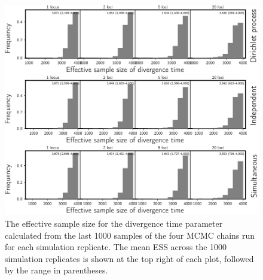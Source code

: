 \begin{figure}[htbp]
    \begin{center}
        \includegraphics[width=\textwidth,height=0.9\textheight,keepaspectratio]{../images/from-project-repo/plots/tex-plot-grids/grid-ess-div-time-histograms-cropped.pdf}
        \caption{
            The effective sample size \citep[ESS;][]{Gong2014} for the
            divergence time parameter calculated from the last 1000 samples of
            the four MCMC chains run for each simulation replicate.
            The mean ESS across the 1000 simulation replicates is shown at the
            top right of each plot, followed by the range in parentheses.
        }
        \label{fig:essdivtime}
    \end{center}
\end{figure}

